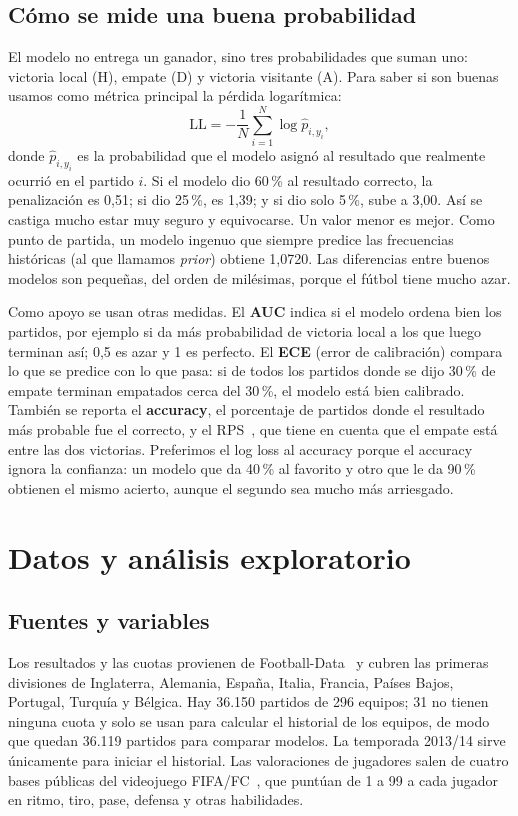 \documentclass[conference]{IEEEtran}
\begin{document}
\subsection{Cómo se mide una buena probabilidad}
El modelo no entrega un ganador, sino tres probabilidades que suman uno: victoria local (H), empate (D) y victoria visitante (A). Para saber si son buenas usamos como métrica principal la pérdida logarítmica:
\begin{equation}
\mathrm{LL}=-\frac{1}{N}\sum_{i=1}^{N}\log \hat p_{i,y_i},
\label{eq:ll}
\end{equation}
donde $\hat p_{i,y_i}$ es la probabilidad que el modelo asignó al resultado que realmente ocurrió en el partido $i$. Si el modelo dio 60\,\% al resultado correcto, la penalización es 0,51; si dio 25\,\%, es 1,39; y si dio solo 5\,\%, sube a 3,00. Así se castiga mucho estar muy seguro y equivocarse. Un valor menor es mejor. Como punto de partida, un modelo ingenuo que siempre predice las frecuencias históricas (al que llamamos \emph{prior}) obtiene 1{,}0720. Las diferencias entre buenos modelos son pequeñas, del orden de milésimas, porque el fútbol tiene mucho azar.

Como apoyo se usan otras medidas. El \textbf{AUC} indica si el modelo ordena bien los partidos, por ejemplo si da más probabilidad de victoria local a los que luego terminan así; 0,5 es azar y 1 es perfecto. El \textbf{ECE} (error de calibración) compara lo que se predice con lo que pasa: si de todos los partidos donde se dijo 30\,\% de empate terminan empatados cerca del 30\,\%, el modelo está bien calibrado. También se reporta el \textbf{accuracy}, el porcentaje de partidos donde el resultado más probable fue el correcto, y el RPS~\cite{epstein1969}, que tiene en cuenta que el empate está entre las dos victorias. Preferimos el log loss al accuracy porque el accuracy ignora la confianza: un modelo que da 40\,\% al favorito y otro que le da 90\,\% obtienen el mismo acierto, aunque el segundo sea mucho más arriesgado.

\section{Datos y análisis exploratorio}
\label{sec:datos}
\subsection{Fuentes y variables}
Los resultados y las cuotas provienen de Football-Data~\cite{footballdata} y cubren las primeras divisiones de Inglaterra, Alemania, España, Italia, Francia, Países Bajos, Portugal, Turquía y Bélgica. Hay 36.150 partidos de 296 equipos; 31 no tienen ninguna cuota y solo se usan para calcular el historial de los equipos, de modo que quedan 36.119 partidos para comparar modelos. La temporada 2013/14 sirve únicamente para iniciar el historial. Las valoraciones de jugadores salen de cuatro bases públicas del videojuego FIFA/FC~\cite{kagglefifa}, que puntúan de 1 a 99 a cada jugador en ritmo, tiro, pase, defensa y otras habilidades.
\end{document}
